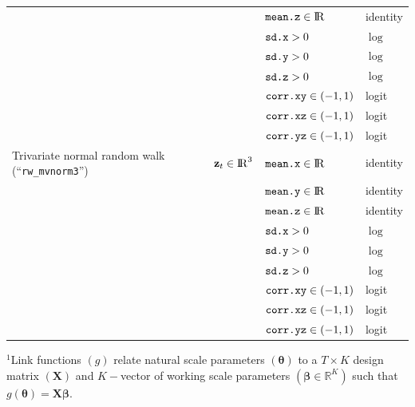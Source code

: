 \documentclass[12pt]{article}\usepackage[]{graphicx}\usepackage[]{xcolor}
\begin{document}
\begin{small}
\begin{table}
\begin{tabular}{llll}
  \rowcolor{Gray}                                       &                                 & $\verb|mean.z|\in{\rm I\!R}$     &  identity \tabularnewline  
  \rowcolor{Gray}                                       &                                 & $\verb|sd.x|>0$               &  $\log$ \tabularnewline                                                
  \rowcolor{Gray}                                       &                                 & $\verb|sd.y|>0$               &  $\log$ \tabularnewline   
  \rowcolor{Gray}                                       &                                 & $\verb|sd.z|>0$               &  $\log$ \tabularnewline
  \rowcolor{Gray}                                       &                                 & $\verb|corr.xy|\in(-1,1)$   &  logit \tabularnewline
  \rowcolor{Gray}                                       &                                 & $\verb|corr.xz|\in(-1,1)$   &  logit \tabularnewline   
  \rowcolor{Gray}                                       &                                 & $\verb|corr.yz|\in(-1,1)$   &  logit \tabularnewline  
  Trivariate normal random walk (``\verb|rw_mvnorm3|'') & ${\mathbf z_t}\in{\rm I\!R}^3$  & $\verb|mean.x|\in{\rm I\!R}$     &  identity \tabularnewline  
  \rowcolor{Gray}                                       &                                 & $\verb|mean.y|\in{\rm I\!R}$     &  identity \tabularnewline  
  \rowcolor{Gray}                                       &                                 & $\verb|mean.z|\in{\rm I\!R}$     &  identity \tabularnewline  
  \rowcolor{Gray}                                       &                                 & $\verb|sd.x|>0$               &  $\log$ \tabularnewline                                                
  \rowcolor{Gray}                                       &                                 & $\verb|sd.y|>0$               &  $\log$ \tabularnewline   
  \rowcolor{Gray}                                       &                                 & $\verb|sd.z|>0$               &  $\log$ \tabularnewline
  \rowcolor{Gray}                                       &                                 & $\verb|corr.xy|\in(-1,1)$   &  logit \tabularnewline
  \rowcolor{Gray}                                       &                                 & $\verb|corr.xz|\in(-1,1)$   &  logit \tabularnewline   
  \rowcolor{Gray}                                       &                                 & $\verb|corr.yz|\in(-1,1)$   &  logit \tabularnewline  
  \bottomrule
  \end{tabular}
  \footnotesize{$^1$Link functions $(g)$ relate natural scale parameters $({\boldsymbol \theta})$ to a $T \times K$ design matrix $({\mathbf X})$ and $K-$vector of working scale parameters $(\boldsymbol{\beta}\in \mathbb{R}^K)$ such that $g({\boldsymbol \theta})={\mathbf X}\boldsymbol{\beta}$. %
}
\end{table}
\end{small}
\end{document}
